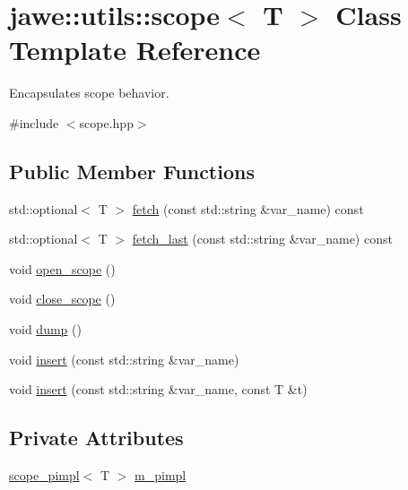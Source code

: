\hypertarget{classjawe_1_1utils_1_1scope}{}\section{jawe\+:\+:utils\+:\+:scope$<$ T $>$ Class Template Reference}
\label{classjawe_1_1utils_1_1scope}


Encapsulates scope behavior.  




{\ttfamily \#include $<$scope.\+hpp$>$}

\subsection*{Public Member Functions}
\begin{DoxyCompactItemize}
\item 
std\+::optional$<$ T $>$ \hyperlink{classjawe_1_1utils_1_1scope_aa0db4d0cbe6a4020ed496cd5cbcd8e6a}{fetch} (const std\+::string \&var\+\_\+name) const
\item 
std\+::optional$<$ T $>$ \hyperlink{classjawe_1_1utils_1_1scope_a0c78dd9721664a665190297c4a5b06a7}{fetch\+\_\+last} (const std\+::string \&var\+\_\+name) const
\item 
void \hyperlink{classjawe_1_1utils_1_1scope_a8635bf451db602f690e326d063833e95}{open\+\_\+scope} ()
\item 
void \hyperlink{classjawe_1_1utils_1_1scope_ac4bd45abba69e003aa37864ef5435288}{close\+\_\+scope} ()
\item 
void \hyperlink{classjawe_1_1utils_1_1scope_a97240fdcdf9b05029449ba0f652c3417}{dump} ()
\item 
void \hyperlink{classjawe_1_1utils_1_1scope_ab64ac5cc3bce5c9909aff566ac50fac0}{insert} (const std\+::string \&var\+\_\+name)
\item 
void \hyperlink{classjawe_1_1utils_1_1scope_a1ec20561626de104ee908db764db552f}{insert} (const std\+::string \&var\+\_\+name, const T \&t)
\end{DoxyCompactItemize}
\subsection*{Private Attributes}
\begin{DoxyCompactItemize}
\item 
\hyperlink{classjawe_1_1utils_1_1scope__pimpl}{scope\+\_\+pimpl}$<$ T $>$ \hyperlink{classjawe_1_1utils_1_1scope_ae0aa866c7970de64388bc9ef1d835707}{m\+\_\+pimpl}
\end{DoxyCompactItemize}


